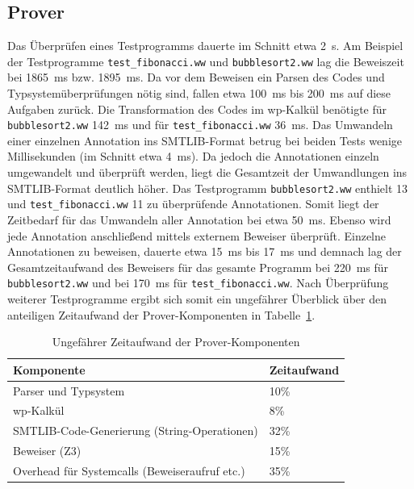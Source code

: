 \subsection{Prover}
Das Überprüfen eines Testprogramms dauerte im Schnitt etwa 2~s. Am Beispiel der Testprogramme \texttt{test\_fibonacci.ww} und \texttt{bubblesort2.ww} lag die Beweiszeit bei 1865~ms bzw. 1895~ms. Da vor dem Beweisen ein Parsen des Codes und Typsystemüberprüfungen nötig sind, fallen etwa 100~ms bis 200~ms auf diese Aufgaben zurück. Die Transformation des Codes im wp-Kalkül benötigte für \texttt{bubblesort2.ww} 142~ms und für \texttt{test\_fibonacci.ww} 36~ms. Das Umwandeln einer einzelnen Annotation ins SMTLIB-Format betrug bei beiden Tests wenige Millisekunden (im Schnitt etwa 4~ms). Da jedoch die Annotationen einzeln umgewandelt und überprüft werden, liegt die Gesamtzeit der Umwandlungen ins SMTLIB-Format deutlich höher. Das Testprogramm \texttt{bubblesort2.ww} enthielt 13 und \texttt{test\_fibonacci.ww} 11 zu überprüfende Annotationen. Somit liegt der Zeitbedarf für das Umwandeln aller Annotation bei etwa 50~ms. Ebenso wird jede Annotation anschließend mittels externem Beweiser überprüft. Einzelne Annotationen zu beweisen, dauerte etwa 15~ms bis 17~ms und demnach lag der Gesamtzeitaufwand des Beweisers für das gesamte Programm bei 220~ms für \texttt{bubblesort2.ww} und bei 170~ms für \texttt{test\_fibonacci.ww}. Nach Überprüfung weiterer Testprogramme ergibt sich somit ein ungefährer Überblick über den anteiligen Zeitaufwand der Prover-Komponenten in Tabelle~\ref{zeitaufwandprover}.

\begin{table}
\centering
\caption{Ungefährer Zeitaufwand der Prover-Komponenten}
\label{zeitaufwandprover}
\begin{tabular}{|l|l|}
\hline
\textbf{Komponente} & \textbf{Zeitaufwand} \\
\hline
Parser und Typsystem & 10\% \\
\hline
wp-Kalkül & 8\% \\
\hline
SMTLIB-Code-Generierung (String-Operationen) & 32\% \\
\hline
Beweiser (Z3) & 15\% \\
\hline
Overhead für Systemcalls (Beweiseraufruf etc.) & 35\% \\
\hline
\end{tabular}
\end{table}

